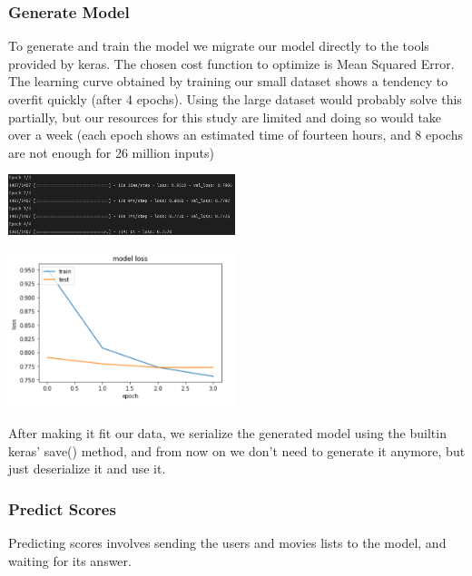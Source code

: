 \subsubsection*{Generate Model}
To generate and train the model we migrate our model directly to the tools provided by keras.
The chosen cost function to optimize is Mean Squared Error.\\
The learning curve obtained by training our small dataset shows a tendency to overfit quickly (after 4 epochs).
Using the large dataset would probably solve this partially, but our resources for this study are limited
and doing so would take over a week (each epoch shows an estimated time of fourteen hours, and 8 epochs are not enough for 26 million inputs)
\begin{center}
    \captionsetup{type=figure}
    \includegraphics[width=250px]{images/nn-train-sm.png}
\end{center}
\begin{center}
    \captionsetup{type=figure}
    \includegraphics[width=250px]{images/nn-learn.png}
\end{center}
After making it fit our data, we serialize the generated model using the builtin keras' save() method,
and from now on we don't need to generate it anymore, but just deserialize it and use it.

\subsubsection*{Predict Scores}
Predicting scores involves sending the users and movies lists to the model, and waiting for its answer.

